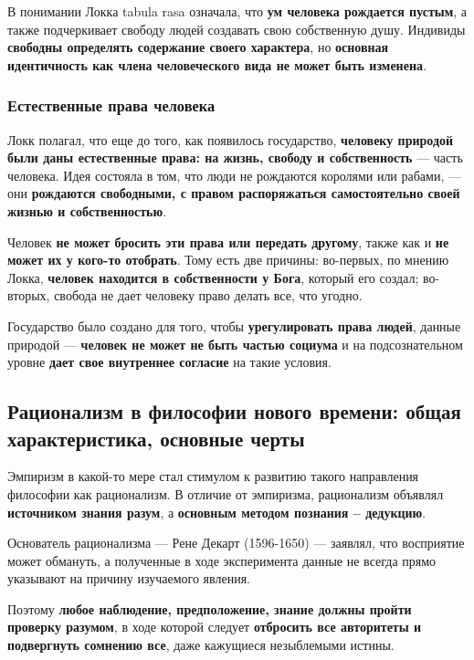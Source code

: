 \documentclass{article}
\begin{document}
\begin{flushleft}
\hfill

В понимании Локка tabula rasa означала, что \textbf{ум человека рождается пустым}, а также подчеркивает свободу людей создавать свою собственную душу. Индивиды \textbf{свободны определять содержание своего характера}, но \textbf{основная идентичность как члена человеческого вида не может быть изменена}.

\subsubsection{Естественные права человека}

Локк полагал, что еще до того, как появилось государство, \textbf{человеку природой были даны естественные права: на жизнь, свободу и собственность} — часть человека. Идея состояла в том, что люди не рождаются королями или рабами, — они \textbf{рождаются свободными, с правом распоряжаться самостоятельно своей жизнью и собственностью}.

\hfill

Человек \textbf{не может бросить эти права или передать другому}, также как и \textbf{не может их у кого-то отобрать}. Тому есть две причины: во-первых, по мнению Локка, \textbf{человек находится в собственности у Бога}, который его создал; во-вторых, свобода не дает человеку право делать все, что угодно.

\hfill

Государство было создано для того, чтобы \textbf{урегулировать права людей}, данные природой — \textbf{человек не может не быть частью социума} и на подсознательном уровне \textbf{дает свое внутреннее согласие} на такие условия.

\subsection{Рационализм в философии нового времени: общая характеристика, основные черты}

Эмпиризм в какой-то мере стал стимулом к развитию такого направления философии как рационализм. В отличие от эмпиризма, рационализм объявлял \textbf{источником знания разум}, а \textbf{основным методом познания – дедукцию}.

Основатель рационализма — Рене Декарт (1596-1650) — заявлял, что восприятие может обмануть, а полученные в ходе эксперимента данные не всегда прямо указывают на причину изучаемого явления.

Поэтому \textbf{любое наблюдение, предположение, знание должны пройти проверку разумом}, в ходе которой следует \textbf{отбросить все авторитеты и подвергнуть сомнению все}, даже кажущиеся незыблемыми истины.


\end{flushleft}
\end{document}
